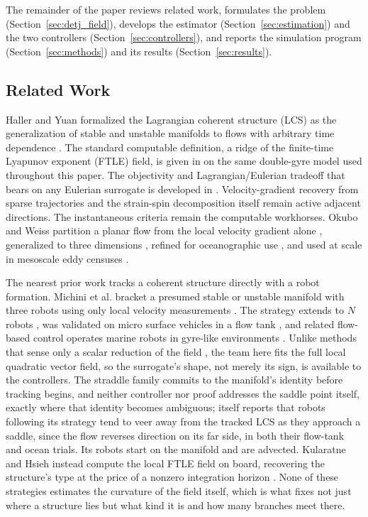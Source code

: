 \documentclass[lettersize,journal]{IEEEtran}
\begin{document}
The remainder of the paper reviews related work, formulates the problem
(Section~\ref{sec:detj_field}), develops the estimator
(Section~\ref{sec:estimation}) and the two controllers
(Section~\ref{sec:controllers}), and reports the simulation program
(Section~\ref{sec:methods}) and its results
(Section~\ref{sec:results}).

\subsection{Related Work}
\label{sec:related_robots}

Haller and Yuan formalized the Lagrangian coherent structure (LCS) as
the generalization of stable and unstable manifolds to flows with
arbitrary time dependence \cite{13}. The standard computable definition,
a ridge of the finite-time Lyapunov exponent (FTLE) field, is given in
\cite{15} on the same double-gyre model used throughout this paper. The
objectivity and Lagrangian/Eulerian tradeoff that bears on any Eulerian
surrogate is developed in \cite{23,24,25}. Velocity-gradient
recovery from sparse trajectories \cite{26} and the strain-spin
decomposition itself \cite{27} remain active adjacent directions. The
instantaneous criteria remain the computable workhorses. Okubo and Weiss
partition a planar flow from the local velocity gradient alone
\cite{28,29}, generalized to three dimensions \cite{30}, refined for
oceanographic use \cite{31}, and used at scale in mesoscale eddy censuses
\cite{16}.

The nearest prior work tracks a coherent structure directly with a
robot formation. Michini et al. bracket a presumed stable or unstable
manifold with three robots using only local velocity measurements
\cite{17}. The strategy extends to $N$ robots \cite{18}, was validated
on micro surface vehicles in a flow tank \cite{19}, and related
flow-based control operates marine robots in gyre-like environments
\cite{20}. Unlike methods that sense only a scalar reduction of the
field \cite{32}, the team here fits the full local quadratic vector
field, so the surrogate's shape, not merely its sign, is available to
the controllers. The straddle family commits to the manifold's identity
before tracking begins, and neither controller nor proof addresses the
saddle point itself, exactly where that identity becomes ambiguous;
\cite{17} itself reports that robots following its strategy tend to
veer away from the tracked LCS as they approach a saddle, since the
flow reverses direction on its far side, in both their flow-tank and
ocean trials. Its robots start on the manifold and are advected.
Kularatne and Hsieh instead compute the local FTLE field on board,
recovering the structure's type at the price of a nonzero integration
horizon \cite{21}. None of these strategies estimates the curvature of
the field itself, which is what fixes not just where a structure lies
but what kind it is and how many branches meet there.
\end{document}
